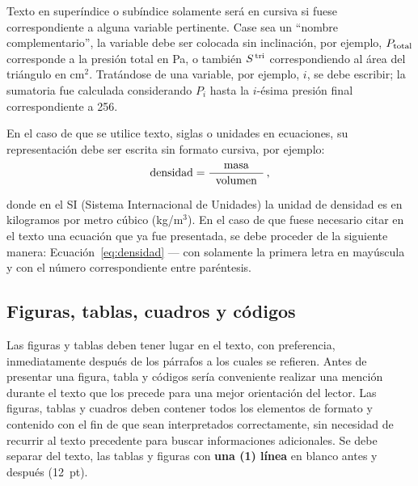 \documentclass[12pt, a4paper, twoside, twocolumn]{article}
\begin{document}
Texto en superíndice o subíndice solamente será en cursiva si fuese correspondiente a alguna variable pertinente. Case sea un ``nombre complementario'', la variable debe ser colocada sin inclinación, por ejemplo, $P_{\text{total}}$ corresponde a la presión total en Pa, o también $S^{\text{\,tri}}$ correspondiendo al área del triángulo en cm$^2$. Tratándose de una variable, por ejemplo, $i$, se debe escribir; la sumatoria fue calculada considerando $P_i$ hasta la $i$-ésima presión final correspondiente a 256.

En el caso de que se utilice texto, siglas o unidades en ecuaciones, su representación debe ser escrita sin formato cursiva, por ejemplo:
%
\begin{equation}
	\text{densidad} = \frac{\text{masa}}{\;\;\text{volumen}\;\;}\,,
\label{eq:densidad}
\end{equation}

donde en el SI (Sistema Internacional de Unidades) la unidad de densidad es en kilogramos por metro cúbico (kg/m$^3$).
%
En el caso de que fuese necesario citar en el texto una ecuación que ya fue presentada, se debe proceder de la siguiente manera: Ecuación~\eqref{eq:densidad} --- con solamente la primera letra en mayúscula y con el número correspondiente entre paréntesis.

\subsection{Figuras, tablas, cuadros y códigos}

Las figuras y tablas deben tener lugar en el texto, con preferencia, inmediatamente después de los párrafos a los cuales se refieren. Antes de presentar una figura, tabla y códigos sería conveniente realizar una mención durante el texto que los precede para una mejor orientación del lector. Las figuras, tablas y cuadros deben contener todos los elementos de formato y contenido con el fin de que sean interpretados correctamente, sin necesidad de recurrir al texto precedente para buscar informaciones adicionales. Se debe separar del texto, las tablas y figuras con \textbf{una (1) línea} en blanco antes y después (12~pt).

\end{document}
